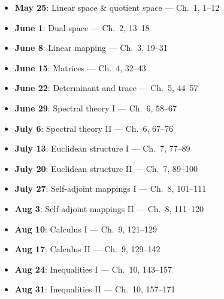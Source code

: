 \documentclass{article}
\begin{document}
\begin{itemize}
  \item \textbf{May 25}: Linear space \& quotient space — Ch.~1, 1–12
  \item \textbf{June 1}: Dual space — Ch.~2, 13–18
  \item \textbf{June 8}: Linear mapping — Ch.~3, 19–31
  \item \textbf{June 15}: Matrices — Ch.~4, 32–43
  \item \textbf{June 22}: Determinant and trace — Ch.~5, 44–57
  \item \textbf{June 29}: Spectral theory I — Ch.~6, 58–67
  \item \textbf{July 6}: Spectral theory II — Ch.~6, 67–76
  \item \textbf{July 13}: Euclidean structure I — Ch.~7, 77–89
  \item \textbf{July 20}: Euclidean structure II — Ch.~7, 89–100
  \item \textbf{July 27}: Self‑adjoint mappings I — Ch.~8, 101–111
  \item \textbf{Aug 3}: Self‑adjoint mappings II — Ch.~8, 111–120
  \item \textbf{Aug 10}: Calculus I — Ch.~9, 121–129
  \item \textbf{Aug 17}: Calculus II — Ch.~9, 129–142
  \item \textbf{Aug 24}: Inequalities I — Ch.~10, 143–157
  \item \textbf{Aug 31}: Inequalities II — Ch.~10, 157–171
\end{itemize}
\end{document}
